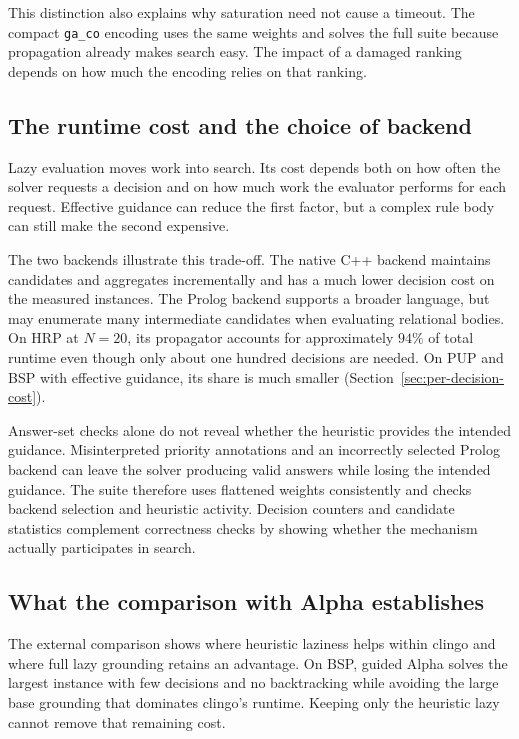This distinction also explains why saturation need not cause a timeout. The compact \texttt{ga\_co} encoding uses the same weights and solves the full suite because propagation already makes search easy. The impact of a damaged ranking depends on how much the encoding relies on that ranking.

\subsection{The runtime cost and the choice of backend}

Lazy evaluation moves work into search. Its cost depends both on how often the solver requests a decision and on how much work the evaluator performs for each request. Effective guidance can reduce the first factor, but a complex rule body can still make the second expensive.

The two backends illustrate this trade-off. The native C++ backend maintains candidates and aggregates incrementally and has a much lower decision cost on the measured instances. The Prolog backend supports a broader language, but may enumerate many intermediate candidates when evaluating relational bodies. On HRP at $N=20$, its propagator accounts for approximately $94\%$ of total runtime even though only about one hundred decisions are needed. On PUP and BSP with effective guidance, its share is much smaller (Section~\ref{sec:per-decision-cost}).

Answer-set checks alone do not reveal whether the heuristic provides the intended guidance. Misinterpreted priority annotations and an incorrectly selected Prolog backend can leave the solver producing valid answers while losing the intended guidance. The suite therefore uses flattened weights consistently and checks backend selection and heuristic activity. Decision counters and candidate statistics complement correctness checks by showing whether the mechanism actually participates in search.

\subsection{What the comparison with Alpha establishes}

The external comparison shows where heuristic laziness helps within clingo and where full lazy grounding retains an advantage. On BSP, guided Alpha solves the largest instance with few decisions and no backtracking while avoiding the large base grounding that dominates clingo's runtime. Keeping only the heuristic lazy cannot remove that remaining cost.

